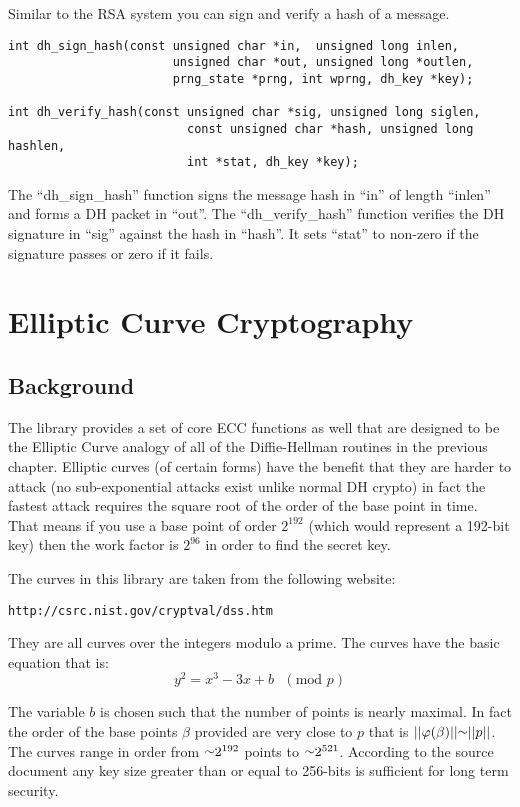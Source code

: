 \documentclass{book}
\def\approx{\raisebox{0.2ex}{\mbox{\small $\sim$}}}
\def\phi{\varphi}
\begin{document}
Similar to the RSA system you can sign and verify a hash of a message.
\begin{verbatim}
int dh_sign_hash(const unsigned char *in,  unsigned long inlen,
                       unsigned char *out, unsigned long *outlen,
                       prng_state *prng, int wprng, dh_key *key);

int dh_verify_hash(const unsigned char *sig, unsigned long siglen,
                         const unsigned char *hash, unsigned long hashlen, 
                         int *stat, dh_key *key);
\end{verbatim}

The ``dh\_sign\_hash'' function signs the message hash in ``in'' of length ``inlen'' and forms a DH packet in ``out''.  
The ``dh\_verify\_hash'' function verifies the DH signature in ``sig'' against the hash in ``hash''.  It sets ``stat''
to non-zero if the signature passes or zero if it fails.

\chapter{Elliptic Curve Cryptography}

\section{Background}
The library provides a set of core ECC functions as well that are designed to be the Elliptic Curve analogy of all of the 
Diffie-Hellman routines in the previous chapter.  Elliptic curves (of certain forms) have the benefit that they are harder
to attack (no sub-exponential attacks exist unlike normal DH crypto) in fact the fastest attack requires the square root
of the order of the base point in time.  That means if you use a base point of order $2^{192}$ (which would represent a
192-bit key) then the work factor is $2^{96}$ in order to find the secret key.

The curves in this library are taken from the following website:
\begin{verbatim}
http://csrc.nist.gov/cryptval/dss.htm
\end{verbatim}

They are all curves over the integers modulo a prime.  The curves have the basic equation that is:
\begin{equation}
y^2 = x^3 - 3x + b\mbox{ }(\mbox{mod }p)
\end{equation}

The variable $b$ is chosen such that the number of points is nearly maximal.  In fact the order of the base points $\beta$ 
provided are very close to $p$ that is $\vert \vert \phi(\beta) \vert \vert \approx \vert \vert p \vert \vert$.  The curves
range in order from $\approx 2^{192}$ points to $\approx 2^{521}$.  According to the source document any key size greater
than or equal to 256-bits is sufficient for long term security.  
\end{document}
